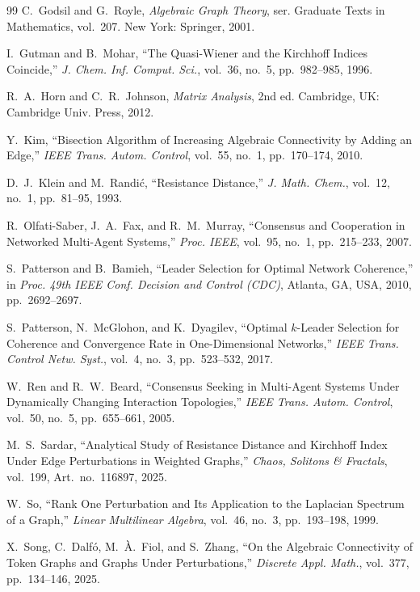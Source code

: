 \documentclass[11pt]{article}
\numberwithin{equation}{section}
\theoremstyle{definition}
\theoremstyle{remark}
\begin{document}
\begin{thebibliography}{99}
	C.~Godsil and G.~Royle,
	\emph{Algebraic Graph Theory}, ser. Graduate Texts in Mathematics, vol.~207.
	New York: Springer, 2001.
	
	I.~Gutman and B.~Mohar,
	``The Quasi-Wiener and the Kirchhoff Indices Coincide,''
	\emph{J. Chem. Inf. Comput. Sci.}, vol.~36, no.~5, pp.~982--985, 1996.
	
	R.~A.~Horn and C.~R.~Johnson,
	\emph{Matrix Analysis}, 2nd ed. Cambridge, UK: Cambridge Univ. Press, 2012.
	
	Y.~Kim,
	``Bisection Algorithm of Increasing Algebraic Connectivity by Adding an Edge,''
	\emph{IEEE Trans. Autom. Control}, vol.~55, no.~1, pp.~170--174, 2010.
	
	D.~J.~Klein and M.~Randi{\'c},
	``Resistance Distance,''
	\emph{J. Math. Chem.}, vol.~12, no.~1, pp.~81--95, 1993.
	
	R.~Olfati-Saber, J.~A.~Fax, and R.~M.~Murray,
	``Consensus and Cooperation in Networked Multi-Agent Systems,''
	\emph{Proc. IEEE}, vol.~95, no.~1, pp.~215--233, 2007.
	
	S.~Patterson and B.~Bamieh,
	``Leader Selection for Optimal Network Coherence,''
	in \emph{Proc. 49th IEEE Conf. Decision and Control (CDC)}, Atlanta, GA, USA, 2010, pp.~2692--2697.
	
	S.~Patterson, N.~McGlohon, and K.~Dyagilev,
	``Optimal $k$-Leader Selection for Coherence and Convergence Rate in One-Dimensional Networks,''
	\emph{IEEE Trans. Control Netw. Syst.}, vol.~4, no.~3, pp.~523--532, 2017.
	
	W.~Ren and R.~W.~Beard,
	``Consensus Seeking in Multi-Agent Systems Under Dynamically Changing Interaction Topologies,''
	\emph{IEEE Trans. Autom. Control}, vol.~50, no.~5, pp.~655--661, 2005.
	
	M.~S.~Sardar,
	``Analytical Study of Resistance Distance and Kirchhoff Index Under Edge Perturbations in Weighted Graphs,''
	\emph{Chaos, Solitons \& Fractals}, vol.~199, Art.~no.~116897, 2025.
	
	W.~So,
	``Rank One Perturbation and Its Application to the Laplacian Spectrum of a Graph,''
	\emph{Linear Multilinear Algebra}, vol.~46, no.~3, pp.~193--198, 1999.
	
	X.~Song, C.~Dalf{\'o}, M.~{\`A}.~Fiol, and S.~Zhang,
	``On the Algebraic Connectivity of Token Graphs and Graphs Under Perturbations,''
	\emph{Discrete Appl. Math.}, vol.~377, pp.~134--146, 2025.
	

\end{thebibliography}
\end{document}
